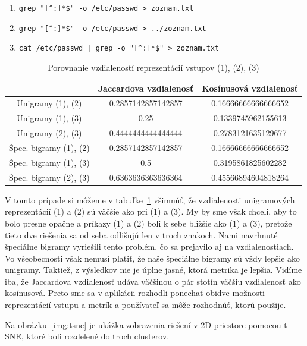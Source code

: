 \begin{enumerate}[label={(\arabic*)}]
	\item \verb'grep "[^:]*$" -o /etc/passwd > zoznam.txt'
	\item \verb'grep "[^:]*$" -o /etc/passwd > ../zoznam.txt'
	\item \verb'cat /etc/passwd | grep -o "[^:]*$" > zoznam.txt'
\end{enumerate}

\begin{table}[h]
	\centering
	\begin{tabular}{|c||c|c|} 
		\hline
		& Jaccardova vzdialenosť
		& Kosínusová vzdialenosť\\
		\hline
		Unigramy (1), (2) & 0.2857142857142857 & 0.16666666666666652\\
		\hline
		Unigramy (1), (3) & 0.25 & 0.1339745962155613\\
		\hline
		Unigramy (2), (3) & 0.4444444444444444 & 0.2783121635129677\\
		\Xhline{1.5pt}
		Špec. bigramy (1), (2) & 0.2857142857142857 & 0.16666666666666652\\
		\hline
		Špec. bigramy (1), (3) & 0.5 & 0.3195861825602282\\
		\hline
		Špec. bigramy (2), (3) & 0.6363636363636364 & 0.45566894604818264\\
		\hline
	\end{tabular}
	\caption[Porovnanie vzdialeností reprezentácií vstupov (1), (2), (3)]{Porovnanie vzdialeností reprezentácií vstupov (1), (2), (3)}
	\label{tab:distances2}
\end{table}

V tomto prípade si môžeme v tabuľke~\ref{tab:distances2}
všimnúť, že vzdialenosti unigramových reprezentácií
(1) a (2) sú väčšie ako pri (1) a (3). My by sme však chceli, aby to bolo presne opačne
a príkazy (1) a (2) boli k sebe bližšie ako (1) a (3), pretože tieto dve riešenia sa
od seba odlišujú len v troch znakoch. Nami navrhnuté špeciálne bigramy
vyriešili tento problém, čo sa prejavilo aj na vzdialenostiach.
Vo všeobecnosti však nemusí platiť, že naše špeciálne bigramy sú vždy lepšie ako unigramy. Taktiež, z výsledkov nie je úplne jasné, ktorá metrika
je lepšia. Vidíme iba, že Jaccardova vzdialenosť udáva väčšinou o pár stotín
väčšiu vzdialenosť ako kosínusová.
Preto sme sa v aplikácii rozhodli ponechať obidve možnosti reprezentácií vstupu a
metrík a používateľ sa môže rozhodnúť, ktorú použije. 

Na obrázku~\ref{img:tsne} je ukážka zobrazenia riešení v 2D priestore pomocou
t-SNE, ktoré boli rozdelené do troch clusterov.

